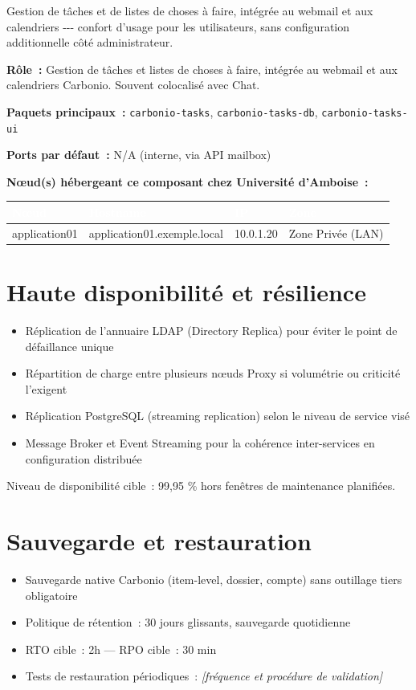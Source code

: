 \documentclass[11pt,a4paper]{report}
\newcommand{\placeholder}[1]{\textit{\textcolor{placeholdercol}{[#1]}}\par\vspace{4pt}}
\newcommand{\tblhead}[1]{\textcolor{white}{\textbf{#1}}}
\begin{document}
Gestion de tâches et de listes de choses à faire, intégrée au webmail et aux calendriers -\allowbreak{}-\allowbreak{}-\allowbreak{} confort d'usage pour les utilisateurs, sans configuration additionnelle côté administrateur.\allowbreak{}

\textbf{Rôle~:} Gestion de tâches et listes de choses à faire, intégrée au webmail et aux calendriers Carbonio.\allowbreak{} Souvent colocalisé avec Chat.\allowbreak{}

\textbf{Paquets principaux~:} \texttt{carbonio-\allowbreak{}tasks}, \texttt{carbonio-\allowbreak{}tasks-\allowbreak{}db}, \texttt{carbonio-\allowbreak{}tasks-\allowbreak{}ui}

\textbf{Ports par défaut~:} N/A (interne, via API mailbox)

\textbf{Nœud(s) hébergeant ce composant chez Université d'Amboise~:}
\begin{longtable}{|p{3.2cm}|p{4.5cm}|p{3.2cm}|p{2.3cm}|}
\hline
\rowcolor{primary}\tblhead{Nœud} & \tblhead{Hostname} & \tblhead{IP} & \tblhead{Zone} \\
\hline
\endhead
application01 & application01.\allowbreak{}exemple.\allowbreak{}local & 10.\allowbreak{}0.\allowbreak{}1.\allowbreak{}20 & Zone Privée (LAN) \\
\hline
\end{longtable}


\section{Haute disponibilité et résilience}
\begin{itemize}[nosep]
  \item Réplication de l'annuaire LDAP (Directory Replica) pour éviter le point de défaillance unique
  \item Répartition de charge entre plusieurs nœuds Proxy si volumétrie ou criticité l'exigent
  \item Réplication PostgreSQL (streaming replication) selon le niveau de service visé
  \item Message Broker et Event Streaming pour la cohérence inter-services en configuration distribuée
\end{itemize}
Niveau de disponibilité cible~: 99,95 \% hors fenêtres de maintenance planifiées.

\section{Sauvegarde et restauration}
\begin{itemize}[nosep]
  \item Sauvegarde native Carbonio (item-level, dossier, compte) sans outillage tiers obligatoire
  \item Politique de rétention~: 30 jours glissants, sauvegarde quotidienne
  \item RTO cible~: 2h --- RPO cible~: 30 min
  \item Tests de restauration périodiques~: \placeholder{fréquence et procédure de validation}
\end{itemize}
\end{document}
